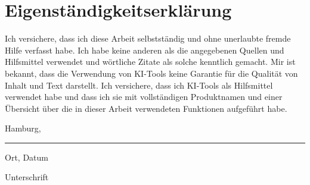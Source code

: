 \section*{Eigenständigkeitserklärung}

Ich versichere, dass ich diese Arbeit selbstständig und ohne unerlaubte fremde Hilfe verfasst habe. Ich habe keine anderen als die angegebenen Quellen und Hilfsmittel verwendet und wörtliche Zitate als solche kenntlich gemacht. Mir ist bekannt, dass die Verwendung von KI-Tools keine Garantie für die Qualität von Inhalt und Text darstellt. Ich versichere, dass ich KI-Tools als Hilfsmittel verwendet habe und dass ich sie mit vollständigen Produktnamen und einer Übersicht über die in dieser Arbeit verwendeten Funktionen aufgeführt habe.\\

\begin{minipage}[H]{0.49\textwidth}
	Hamburg, \Abgabe
\end{minipage}
\begin{minipage}[H]{0.49\textwidth}
	
\end{minipage}

\hrule
\vspace{3mm}

\begin{minipage}[H]{0.49\textwidth}
	Ort, Datum
\end{minipage}
\begin{minipage}[H]{0.49\textwidth}
	Unterschrift
\end{minipage}